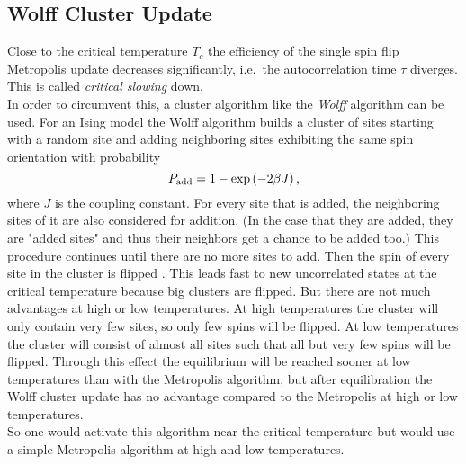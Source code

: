 \subsection{Wolff Cluster Update}
\label{sssec:wolff}
    Close to the critical temperature \(T_c\) the efficiency of the
    single spin flip Metropolis update decreases significantly, i.e.\ the
    autocorrelation time \(\tau\) diverges.
    This is called \emph{critical slowing} down.\\
    In order to circumvent this, a cluster algorithm like the \emph{Wolff}
    algorithm \cite{Wolff1989} can be used.
    For an Ising model the Wolff algorithm builds a cluster of sites
    starting with a random site and adding neighboring sites exhibiting the
    same spin orientation with probability
    \begin{equation}
        P_{\mathrm{add}} = 1-\exp\left(-2\beta J\right),
        \label{eq:wolffAdd}
    \end{equation}
    where \(J\) is the coupling constant.
    For every site that is added, the neighboring sites of it are
    also considered for addition. (In the case that they are added,
    they are "added sites" and thus their neighbors get a chance to be
    added too.)
    This procedure continues until there are no more sites to add.
    Then the spin of every site in the cluster is flipped
    \cite[p. 91ff]{NewmanBarkema1999} \cite[p. 151f]{Katzgraber2011}.
    This leads fast to new uncorrelated states at the critical
    temperature because big clusters are flipped. But there are not
    much advantages at high or low temperatures. At high temperatures the cluster
    will only contain very few sites, so only few spins will be flipped.
    At low temperatures the cluster will consist of almost all sites
    such that all but very few spins will be flipped. Through this effect the equilibrium
    will be reached sooner at low temperatures than with the Metropolis
    algorithm, but after equilibration the Wolff cluster update has no
    advantage compared to the Metropolis at high or low temperatures.\\
    So one would activate this algorithm near the critical temperature
    but would use a simple Metropolis algorithm at high and low temperatures.

